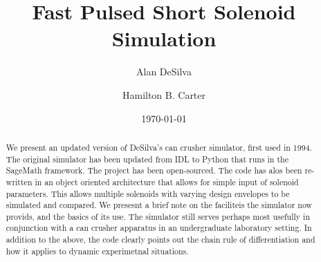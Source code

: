 \documentclass[prb,preprint]{revtex4-1}
\begin{document}

\title{Fast Pulsed Short Solenoid Simulation
}

\author{Alan DeSilva}

\author{Hamilton B. Carter}


\date{\today}

\begin{abstract}
We present an updated version of DeSilva's can crusher simulator, first used in 1994.  The original simulator has been updated from IDL to Python that runs in the SageMath framework.  The project has been open-sourced.  The code has alos been re-written in an object oriented architecture that allows for simple input of solenoid parameters.  This allows multiple solenoids with varying design envelopes to be simulated and compared.  We presesnt a brief note on the faciliteis the simulator now provids, and the basics of its use.  The simulator still serves perhaps most usefully in conjunction with a can crusher apparatus in an undergraduate laboratory setting.  In addition to the above, the code clearly points out the chain rule of differentiation and how it applies to dynamic experimetnal situations.
\end{abstract}

\maketitle %
\end{document}
